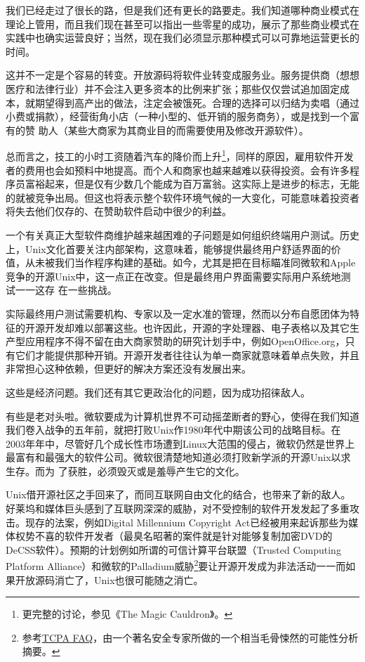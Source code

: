 \documentclass[12pt,oneside]{book}
\begin{document}
我们已经走过了很长的路，但是我们还有更长的路要走。我们知道哪种商业模式在理论上管用，而且我们现在甚至可以指出一些零星的成功，展示了那些商业模式在实践中也确实运营良好；当然，现在我们必须显示那种模式可以可靠地运营更长的时间。

这并不一定是个容易的转变。开放源码将软件业转变成服务业。服务提供商（想想医疗和法律行业）并不会注入更多资本的比例来扩张；那些仅仅尝试追加固定成本，就期望得到高产出的做法，注定会被饿死。合理的选择可以归结为卖唱（通过小费或捐款），经营街角小店（一种小型的、低开销的服务商务），或是找到一个富有的赞
助人（某些大商家为其商业目的而需要使用及修改开源软件）。

总而言之，技工的小时工资随着汽车的降价而上升\footnote{更完整的讨论，参见《The Magic Cauldron》\cite{Raymond01}。}，同样的原因，雇用软件开发者的费用也会如预料中地提高。而个人和商家也越来越难以获得投资。会有许多程序员富裕起来，但是仅有少数几个能成为百万富翁。这实际上是进步的标志，无能的就被竞争出局。但这也将表示整个软件环境气候的一大变化，可能意味着投资者将失去他们仅存的、在赞助软件启动中很少的利益。

一个有关真正大型软件商维护越来越困难的子问题是如何组织终端用户测试。历史上，Unix文化首要关注内部架构，这意味着，能够提供最终用户舒适界面的价值，从未被我们当作程序构建的基础。如今，尤其是把在目标瞄准同微软和Apple竞争的开源Unix中，这一点正在改变。但是最终用户界面需要实际用户系统地测试一一这存
在一些挑战。

实际最终用户测试需要机构、专家以及一定水准的管理，然而以分布自愿团体为特征的开源开发却难以部署这些。也许因此，开源的字处理器、电子表格以及其它生产型应用程序不得不留在由大商家赞助的研究计划手中，例如OpenOffice.org，只有它们才能提供那种开销。开源开发者往往认为单一商家就意味着单点失败，并且非常担心这种依赖，但更好的解决方案还没有发展出来。

这些是经济问题。我们还有其它更政治化的问题，因为成功招徕敌人。

有些是老对头啦。微软要成为计算机世界不可动摇垄断者的野心，使得在我们知道我们卷入战争的五年前，就把打败Unix作1980年代中期该公司的战略目标。在2003年年中，尽管好几个成长性市场遭到Linux大范围的侵占，微软仍然是世界上最富有和最强大的软件公司。微软很清楚地知道必须打败新学派的开源Unix以求生存。而为
了获胜，必须毁灭或是羞辱产生它的文化。

Unix借开源社区之手回来了，而同互联网自由文化的结合，也带来了新的敌人。好莱坞和媒体巨头感到了互联网深深的威胁，对不受控制的软件开发发起了多重攻击。现存的法案，例如Digital Millennium Copyright Act已经被用来起诉那些为媒体权势不喜的软件开发者（最臭名昭著的案件就是针对能够复制加密DVD的DeCSS软件）。预期的计划例如所谓的可信计算平台联盟（Trusted Computing Platform Alliance）和微软的Palladium威胁\footnote{参考\href{http://www.cl.cam.ac.uk/~rja14/tcpa-faq.html}{TCPA FAQ}，由一个著名安全专家所做的一个相当毛骨悚然的可能性分析摘要。}要让开源开发成为非法活动一一而如果开放源码消亡了，Unix也很可能随之消亡。
\end{document}
